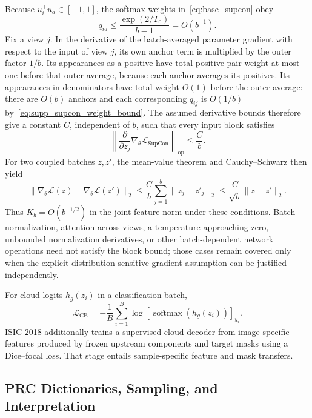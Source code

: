 Because $u_i^\top u_a\in[-1,1]$, the softmax weights in~\eqref{eq:base_supcon} obey
\begin{equation}
 q_{ia}\le \frac{\exp(2/T_0)}{b-1}=O(b^{-1}).
 \label{eq:supp_supcon_weight_bound}
\end{equation}
Fix a view $j$. In the derivative of the batch-averaged parameter gradient with respect to the input of view $j$, its own anchor term is multiplied by the outer factor $1/b$. Its appearances as a positive have total positive-pair weight at most one before that outer average, because each anchor averages its positives. Its appearances in denominators have total weight $O(1)$ before the outer average: there are $O(b)$ anchors and each corresponding $q_{ij}$ is $O(1/b)$ by~\eqref{eq:supp_supcon_weight_bound}. The assumed derivative bounds therefore give a constant $C$, independent of $b$, such that every input block satisfies
\begin{equation}
 \left\|\frac{\partial}{\partial z_j}
 \nabla_\theta\mathcal L_{\mathrm{SupCon}}\right\|_{\mathrm{op}}
 \le \frac{C}{b}.
 \label{eq:supp_supcon_block_bound}
\end{equation}
For two coupled batches $z,z'$, the mean-value theorem and Cauchy--Schwarz then yield
\begin{equation}
 \|\nabla_\theta\mathcal L(z)-\nabla_\theta\mathcal L(z')\|_2
 \le \frac{C}{b}\sum_{j=1}^{b}\|z_j-z'_j\|_2
 \le \frac{C}{\sqrt b}\|z-z'\|_2.
 \label{eq:supp_supcon_joint_bound}
\end{equation}
Thus $K_b=O(b^{-1/2})$ in the joint-feature norm under these conditions. Batch normalization, attention across views, a temperature approaching zero, unbounded normalization derivatives, or other batch-dependent network operations need not satisfy the block bound; those cases remain covered only when the explicit distribution-sensitive-gradient assumption can be justified independently.

For cloud logits $h_g(z_i)$ in a classification batch,
\begin{equation}
 \mathcal L_{\mathrm{CE}}
 =-\frac1B\sum_{i=1}^{B}
 \log[\operatorname{softmax}(h_g(z_i))]_{y_i}.
\label{eq:base_ce}
\end{equation}
ISIC-2018 additionally trains a supervised cloud decoder from image-specific features produced by frozen upstream components and target masks using a Dice--focal loss. That stage entails sample-specific feature and mask transfers.

\subsection{PRC Dictionaries, Sampling, and Interpretation}

